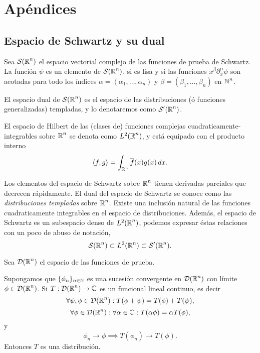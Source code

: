 \chapter{Apéndices}

  \section{Espacio de Schwartz y su dual}

  \begin{definition}
    Sea $\operatorname{\mathcal S}(\operatorname{\mathbb{R}}^{n})$ el espacio vectorial complejo
    de las funciones de prueba de Schwartz. La función
    $\psi$ es un elemento de $\operatorname{\mathcal S}(\operatorname{\mathbb{R}}^{n})$, si es
    lisa y si las funciones $x^{\beta} \partial_x^{\alpha}
    \psi$ son acotadas para todo los índices $\alpha =
    (\alpha_1, \ldots, \alpha_n)$ y $\beta = (\beta_1,
    \ldots, \beta_n)$ en $\operatorname{\mathbb{N}}^{n}$.
  \end{definition}

  \begin{definition}
    El espacio dual de $\operatorname{\mathcal S}(\operatorname{\mathbb{R}}^{n})$ es el espacio de
    las distribuciones (ó funciones generalizadas)
    templadas, y lo denotaremos como $\operatorname{\mathcal S}'(\operatorname{\mathbb{R}}^{n})$.
  \end{definition}

  \begin{definition}
    El espacio de Hilbert de las (clases de) funciones
    complejas cuadraticamente-integrables sobre $\operatorname{\mathbb{R}}^{n}$ se
    denota como $L^2(\operatorname{\mathbb{R}}^{n})$, y está equipado con el
    producto interno
    \[
      \langle f, g \rangle
      = \int_{\operatorname{\mathbb{R}}^{n}} \overline{f}(x) g(x) \, dx.
    \] 
  \end{definition}
 
  Los elementos del espacio de Schwartz sobre $\operatorname{\mathbb{R}}^{n}$
  tienen derivadas parciales que decrecen rápidamente. El
  dual del espacio de Schwartz se conoce como las
  \textit{distribuciones templadas} sobre $\operatorname{\mathbb{R}}^{n}$. Existe
  una inclusión natural de las funciones cuadraticamente
  integrables en el espacio de distribuciones. Además, el
  espacio de Schwartz es un subespacio denso de
  $L^2(\operatorname{\mathbb{R}}^{n})$, podemos expresar éstas relaciones con un
  poco de abuso de notación,
  \[
    \operatorname{\mathcal S}(\operatorname{\mathbb{R}}^{n})
    \subset L^2(\operatorname{\mathbb{R}}^{n})
    \subset \operatorname{\mathcal S}'(\operatorname{\mathbb{R}}^{n}).
  \]

  Sea $\mathcal D(\operatorname{\mathbb{R}}^{n})$ el espacio de las funciones de
  prueba.

  \begin{definition}
    Supongamos que $\{\phi_n\}_{n \in \operatorname{\mathbb{N}}}$ es una sucesión
    convergente en $\mathcal D(\operatorname{\mathbb{R}}^{n})$ con límite $\phi \in
    \mathcal D(\operatorname{\mathbb{R}}^{n})$. Si $T : \mathcal D(\operatorname{\mathbb{R}}^{n}) \to \operatorname{\mathbb{C}}$
    es un funcional lineal continuo, es decir
    \[
      \forall \psi, \phi \in \mathcal D(\operatorname{\mathbb{R}}^{n}) : T(\phi +
      \psi) = T(\phi) + T(\psi),
    \] 
    \[
      \forall \phi \in \mathcal D(\operatorname{\mathbb{R}}^{n}) : \forall \alpha
      \in \operatorname{\mathbb{C}} : T(\alpha \phi) = \alpha T(\phi),
    \] 
    y
    \[
      \phi_n \to \phi \implies T(\phi_n) \to T(\phi).
    \] 
    Entonces $T$ es una distribución.
  \end{definition}

